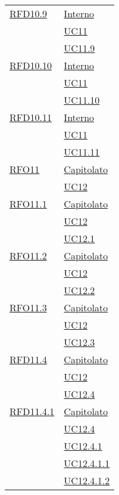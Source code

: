 \begin{longtable}{|>{\centering}m{5cm}|m{5cm}<{\centering}|}
\hyperlink{RFD10.9}{RFD10.9} & \hyperlink{Interno}{Interno}\\
& \hyperref[UC11]{UC11}\\
& \hyperref[UC11.9]{UC11.9}\\ \hline

\hyperlink{RFD10.10}{RFD10.10} & \hyperlink{Interno}{Interno}\\
& \hyperref[UC11]{UC11}\\
& \hyperref[UC11.10]{UC11.10}\\ \hline

\hyperlink{RFD10.11}{RFD10.11} & \hyperlink{Interno}{Interno}\\
& \hyperref[UC11]{UC11}\\
& \hyperref[UC11.11]{UC11.11}\\ \hline

\hyperlink{RFO11}{RFO11} & \hyperlink{Capitolato}{Capitolato}\\
& \hyperref[UC12]{UC12}\\ \hline

\hyperlink{RFO11.1}{RFO11.1} & \hyperlink{Capitolato}{Capitolato}\\
& \hyperref[UC12]{UC12}\\
& \hyperref[UC12.1]{UC12.1}\\ \hline

\hyperlink{RFO11.2}{RFO11.2} & \hyperlink{Capitolato}{Capitolato}\\
& \hyperref[UC12]{UC12}\\
& \hyperref[UC12.2]{UC12.2}\\ \hline

\hyperlink{RFO11.3}{RFO11.3} & \hyperlink{Capitolato}{Capitolato}\\
& \hyperref[UC12]{UC12}\\
& \hyperref[UC12.3]{UC12.3}\\ \hline

\hyperlink{RFD11.4}{RFD11.4} & \hyperlink{Capitolato}{Capitolato}\\
& \hyperref[UC12]{UC12}\\
& \hyperref[UC12.4]{UC12.4}\\ \hline

\hyperlink{RFD11.4.1}{RFD11.4.1} & \hyperlink{Capitolato}{Capitolato}\\
& \hyperref[UC12.4]{UC12.4}\\
& \hyperref[UC12.4.1]{UC12.4.1}\\
& \hyperref[UC12.4.1.1]{UC12.4.1.1}\\
& \hyperref[UC12.4.1.2]{UC12.4.1.2}\\ \hline


\end{longtable}
